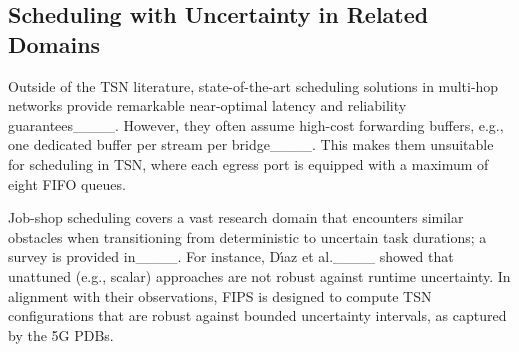 \subsection{Scheduling with Uncertainty in Related Domains}
Outside of the TSN literature, state-of-the-art scheduling solutions in multi-hop networks provide remarkable near-optimal latency and reliability guarantees____.
However, they often assume high-cost forwarding buffers, e.g., one dedicated buffer per stream per bridge____.
This makes them unsuitable for scheduling in TSN, where each egress port is equipped with a maximum of eight FIFO queues.

Job-shop scheduling covers a vast research domain that encounters similar obstacles when transitioning from deterministic to uncertain task durations;
a survey is provided in____.
For instance, D{\'\i}az et al.____ showed that unattuned (e.g., scalar) approaches are not robust against runtime uncertainty.
In alignment with their observations, FIPS is designed to compute TSN configurations that are robust against bounded uncertainty intervals, as captured by the 5G PDBs.